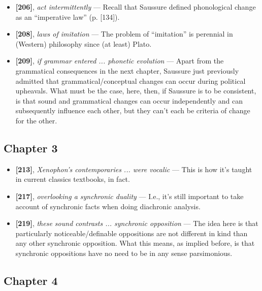 \documentclass[12pt]{article}
\begin{document}
\begin{itemize}
\item \textbf{[206]}, \textit{act intermittently} --- Recall that Saussure defined phonological change as an ``imperative law'' (p. [134]).

\item \textbf{[208]}, \textit{laws of imitation} --- The problem of ``imitation'' is perennial in (Western) philosophy since (at least) Plato.

\item \textbf{[209]}, \textit{if grammar entered ... phonetic evolution} --- Apart from the grammatical consequences in the next chapter, Saussure just previously admitted that grammatical/conceptual changes can occur during political upheavals. What must be the case, here, then, if Saussure is to be consistent, is that sound and grammatical changes can occur independently and can subsequently influence each other, but they can't each be criteria of change for the other.

\end{itemize}

\subsection{Chapter 3}

\begin{itemize}

\item \textbf{[213]}, \textit{Xenophon's contemporaries ... were vocalic} --- This is how it's taught in current classics textbooks, in fact.

\item \textbf{[217]}, \textit{overlooking a synchronic duality} --- I.e., it's still important to take account of synchronic facts when doing diachronic analysis.

\item \textbf{[219]}, \textit{these sound contrasts ... synchronic opposition} --- The idea here is that particularly noticeable/definable oppositions are not different in kind than any other synchronic opposition. What this means, as implied before, is that synchronic oppositions have no need to be in any sense parsimonious. 

\end{itemize}

\subsection{Chapter 4}
\end{document}
